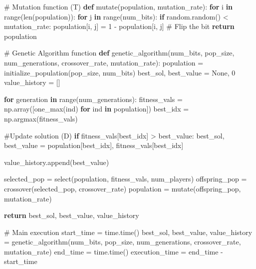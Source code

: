 \documentclass[
  letterpaper,
  DIV=11,
  numbers=noendperiod]{scrreprt}
\newenvironment{Shaded}{\begin{snugshade}}{\end{snugshade}}
\newcommand{\BuiltInTok}[1]{\textcolor[rgb]{0.00,0.23,0.31}{#1}}
\newcommand{\CommentTok}[1]{\textcolor[rgb]{0.37,0.37,0.37}{#1}}
\newcommand{\ControlFlowTok}[1]{\textcolor[rgb]{0.00,0.23,0.31}{\textbf{#1}}}
\newcommand{\DecValTok}[1]{\textcolor[rgb]{0.68,0.00,0.00}{#1}}
\newcommand{\KeywordTok}[1]{\textcolor[rgb]{0.00,0.23,0.31}{\textbf{#1}}}
\newcommand{\NormalTok}[1]{\textcolor[rgb]{0.00,0.23,0.31}{#1}}
\newcommand{\OperatorTok}[1]{\textcolor[rgb]{0.37,0.37,0.37}{#1}}
\newcommand{\VariableTok}[1]{\textcolor[rgb]{0.07,0.07,0.07}{#1}}
\begin{document}
\begin{Shaded}
\begin{Highlighting}[]
\CommentTok{\# Mutation function (T)}
\KeywordTok{def}\NormalTok{ mutate(population, mutation\_rate):}
    \ControlFlowTok{for}\NormalTok{ i }\KeywordTok{in} \BuiltInTok{range}\NormalTok{(}\BuiltInTok{len}\NormalTok{(population)):}
        \ControlFlowTok{for}\NormalTok{ j }\KeywordTok{in} \BuiltInTok{range}\NormalTok{(num\_bits):}
            \ControlFlowTok{if}\NormalTok{ random.random() }\OperatorTok{\textless{}}\NormalTok{ mutation\_rate:}
\NormalTok{                population[i, j] }\OperatorTok{=} \DecValTok{1} \OperatorTok{{-}}\NormalTok{ population[i, j]  }\CommentTok{\# Flip the bit}
    \ControlFlowTok{return}\NormalTok{ population}

\CommentTok{\# Genetic Algorithm function}
\KeywordTok{def}\NormalTok{ genetic\_algorithm(num\_bits, pop\_size, num\_generations, crossover\_rate, mutation\_rate):}
\NormalTok{    population }\OperatorTok{=}\NormalTok{ initialize\_population(pop\_size, num\_bits)}
\NormalTok{    best\_sol, best\_value }\OperatorTok{=} \VariableTok{None}\NormalTok{, }\DecValTok{0}
\NormalTok{    value\_history }\OperatorTok{=}\NormalTok{ []}

    \ControlFlowTok{for}\NormalTok{ generation }\KeywordTok{in} \BuiltInTok{range}\NormalTok{(num\_generations):}
\NormalTok{        fitness\_vals }\OperatorTok{=}\NormalTok{ np.array([one\_max(ind) }\ControlFlowTok{for}\NormalTok{ ind }\KeywordTok{in}\NormalTok{ population])}
\NormalTok{        best\_idx }\OperatorTok{=}\NormalTok{ np.argmax(fitness\_vals)}
        
        \CommentTok{\#Update solution (D)}
        \ControlFlowTok{if}\NormalTok{ fitness\_vals[best\_idx] }\OperatorTok{\textgreater{}}\NormalTok{ best\_value:}
\NormalTok{            best\_sol, best\_value }\OperatorTok{=}\NormalTok{ population[best\_idx], fitness\_vals[best\_idx]}
        
\NormalTok{        value\_history.append(best\_value)}
        
\NormalTok{        selected\_pop }\OperatorTok{=}\NormalTok{ select(population, fitness\_vals, num\_players)}
\NormalTok{        offspring\_pop }\OperatorTok{=}\NormalTok{ crossover(selected\_pop, crossover\_rate)}
\NormalTok{        population }\OperatorTok{=}\NormalTok{ mutate(offspring\_pop, mutation\_rate)}

    \ControlFlowTok{return}\NormalTok{ best\_sol, best\_value, value\_history}

\CommentTok{\# Main execution}
\NormalTok{start\_time }\OperatorTok{=}\NormalTok{ time.time()}
\NormalTok{best\_sol, best\_value, value\_history }\OperatorTok{=}\NormalTok{ genetic\_algorithm(num\_bits, pop\_size, num\_generations, crossover\_rate, mutation\_rate)}
\NormalTok{end\_time }\OperatorTok{=}\NormalTok{ time.time()}
\NormalTok{execution\_time }\OperatorTok{=}\NormalTok{ end\_time }\OperatorTok{{-}}\NormalTok{ start\_time}


\end{Highlighting}
\end{Shaded}
\end{document}
